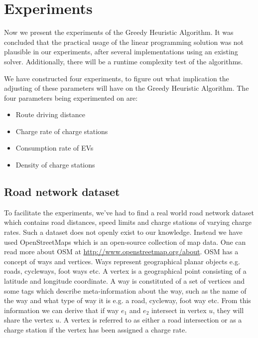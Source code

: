 \section{Experiments}
\label{sec:experiments}
Now we present the experiments of the Greedy Heuristic Algorithm. It was concluded that the practical usage of the linear programming solution was not plausible in our experiments, after several implementations using an existing solver. Additionally, there will be a runtime complexity test of the algorithms.

We have constructed four experiments, to figure out what implication the adjusting of these parameters will have on the Greedy Heuristic Algorithm. The four parameters being experimented on are:
\begin{itemize}
     \item Route driving distance
     \item Charge rate of charge stations
     \item Consumption rate of EVs
     \item Density of charge stations
 \end{itemize} 



\subsection{Road network dataset} 
\label{sub:setup}
To facilitate the experiments, we've had to find a real world road network dataset which contains road distances, speed limits and charge stations of varying charge rates. Such a dataset does not openly exist to our knowledge. Instead we have used OpenStreetMaps which is an open-source collection of map data. One can read more about OSM at \url{http://www.openstreetmap.org/about}. OSM has a concept of ways and vertices. Ways represent geographical planar objects e.g. roads, cycleways, foot ways etc. A vertex is a geographical point consisting of a latitude and longitude coordinate. A way is constituted of a set of vertices and some tags which describe meta-information about the way, such as the name of the way and what type of way it is e.g. a road, cycleway, foot way  etc. From this information we can derive that if way $e_1$ and $e_2$ intersect in vertex $u$, they will share the vertex $u$. A vertex is referred to as either a road intersection or as a charge station if the vertex has been assigned a charge rate.\\

